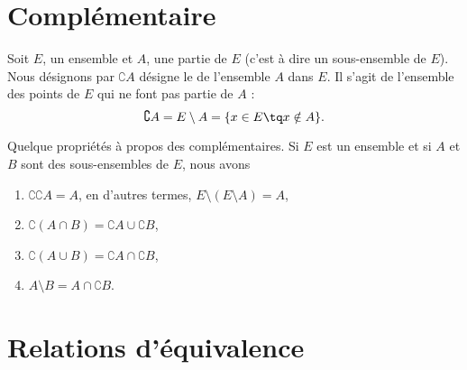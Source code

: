 

\section{Complémentaire}
\label{AppComplement}

Soit $E$, un ensemble et $A$, une partie de $E$ (c'est à dire un sous-ensemble de $E$). Nous désignons par $\complement A$ désigne le  de l'ensemble $A$ dans $E$. Il s'agit de l'ensemble des points de $E$ qui ne font pas partie de $A$ :
\begin{equation}
	\complement A=E\setminus A=\{ x\in E\tq x\notin A \}.
\end{equation}

\begin{lemma}		\label{LemPropsComplement}
	Quelque propriétés à propos des complémentaires. Si $E$ est un ensemble et si $A$ et $B$ sont des sous-ensembles de $E$, nous avons
	\begin{enumerate}
		\item
			$\complement \complement A =A $, en d'autres termes, $E\setminus(E\setminus A)=A$,
		\item
			$\complement(A\cap B)=\complement A\cup\complement B$,
		\item
			$\complement(A\cup B)=\complement A\cap\complement B$,
		\item	\label{ItemLemPropComplementiii}
			$A\setminus B=A\cap\complement B$.
	\end{enumerate}
\end{lemma}

\section{Relations d'équivalence}
\label{appEquivalence}

